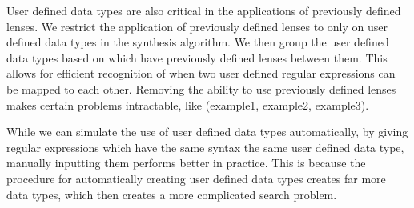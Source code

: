 User defined data types are also critical in the applications of previously
defined lenses.  We restrict the application of previously defined lenses to
only on user defined data types in the synthesis algorithm.  We then group the
user defined data types based on which have previously defined lenses between
them.  This allows for efficient recognition of when two user defined regular
expressions can be mapped to each other.  Removing the ability to use previously
defined lenses makes certain problems intractable, like (example1, example2,
example3).

While we can simulate the use of user defined data types automatically, by
giving regular expressions which have the same syntax the same user defined data
type, manually inputting them performs better in practice.  This is because the
procedure for automatically creating user defined data types creates far more
data types, which then creates a more complicated search problem.

